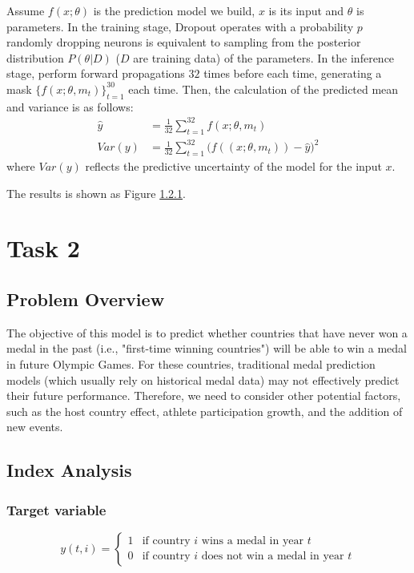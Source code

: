 \documentclass{mcmthesis}
\begin{document}
	
	Assume $f(x;\theta)$ is the prediction model we build, $x$ is its input and $\theta$ is parameters. In the training stage, Dropout operates with a probability $p$
	randomly dropping neurons is equivalent to sampling from the posterior distribution $P(\theta|D)$ ($D$ are training data) of the parameters. In the inference stage, perform forward propagations $32$ times before each time, generating a mask $\{f(x;\theta,m_t)\}_{t=1}^{30}$ each time. Then, the calculation of the predicted mean and variance is as follows:
	\begin{align*}
		\hat{y}&=\frac{1}{32} \sum_{t=1}^{32} f(x;\theta,m_t) \\
		Var(y) &=\frac{1}{32} \sum_{t=1}^{32} \big( f((x;\theta,m_t)) - \hat{y} \big)^2
	\end{align*}
	where $Var(y)$ reflects the predictive uncertainty of the model for the input $x$.
	
	The results is shown as Figure \ref{}.
	
	
	
	
	
	
	\section{Task 2}
	
	
	\subsection{Problem Overview}
	The objective of this model is to predict whether countries that have never won a medal in the past (i.e., "first-time winning countries") will be able to win a medal in future Olympic Games. For these countries, traditional medal prediction models (which usually rely on historical medal data) may not effectively predict their future performance. Therefore, we need to consider other potential factors, such as the host country effect, athlete participation growth, and the addition of new events.
	
	
	\subsection{Index Analysis}
	
	
	\subsubsection{Target variable}
	\[
	y(t,i) = 
	\begin{cases} 
		1 & \text{if country } i \text{ wins a medal in year } t \\ 
		0 & \text{if country } i \text{ does not win a medal in year } t 
	\end{cases}
	\]
\end{document}
